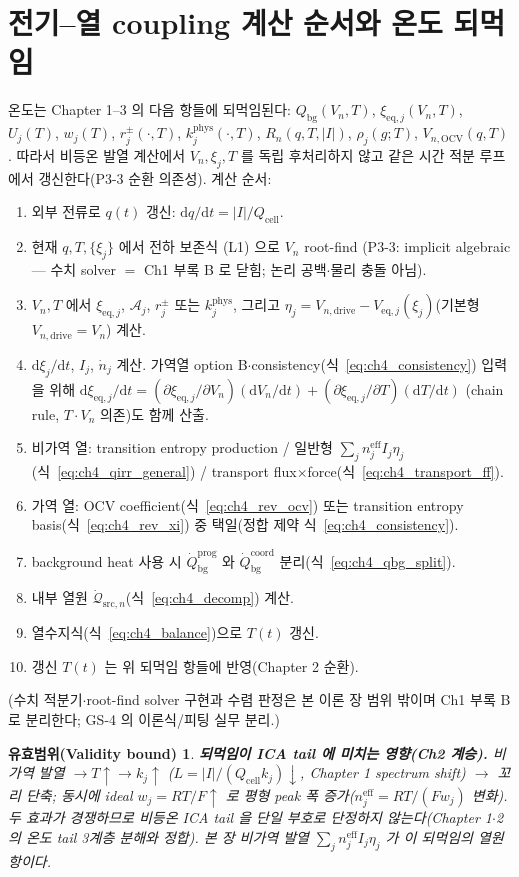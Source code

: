 \documentclass[11pt,a4paper]{article}
\newtheorem*{boundbox}{유효범위(Validity bound)}
\newcommand{\dd}{\mathrm{d}}
\newcommand{\eff}{\mathrm{eff}}
\newcommand{\eq}{\mathrm{eq}}
\newcommand{\drive}{\mathrm{drive}}
\newcommand{\bg}{\mathrm{bg}}
\newcommand{\cell}{\mathrm{cell}}
\newcommand{\OCV}{\mathrm{OCV}}
\newcommand{\src}{\mathrm{src}}
\newcommand{\prog}{\mathrm{prog}}
\newcommand{\coord}{\mathrm{coord}}
\begin{document}
\section{전기--열 coupling 계산 순서와 온도 되먹임}\label{sec:ch4_order}
온도는 Chapter 1--3 의 다음 항들에 되먹임된다: $Q_\bg(V_n,T)$, $\xi_{\eq,j}(V_n,T)$, $U_j(T)$, $w_j(T)$,
$r_j^\pm(\cdot,T)$, $k_j^{\mathrm{phys}}(\cdot,T)$, $R_n(q,T,|I|)$, $\rho_j(g;T)$, $V_{n,\OCV}(q,T)$. 따라서
비등온 발열 계산에서 $V_n,\xi_j,T$ 를 독립 후처리하지 않고 같은 시간 적분 루프에서 갱신한다(P3-3 순환 의존성).
계산 순서:
\begin{enumerate}[label=\arabic*),leftmargin=2.0em]
\item 외부 전류로 $q(t)$ 갱신: $\dd q/\dd t=|I|/Q_\cell$.
\item 현재 $q,T,\{\xi_j\}$ 에서 전하 보존식 (L1) 으로 $V_n$ root-find (P3-3: implicit algebraic — 수치 solver $=$
  Ch1 부록 B 로 닫힘; 논리 공백$\cdot$물리 충돌 아님).
\item $V_n,T$ 에서 $\xi_{\eq,j}$, $\mathcal A_j$, $r_j^\pm$ 또는 $k_j^{\mathrm{phys}}$, 그리고
  $\eta_j=V_{n,\drive}-V_{\eq,j}(\xi_j)$(기본형 $V_{n,\drive}=V_n$) 계산.
\item $\dd\xi_j/\dd t$, $I_j$, $\dot n_j$ 계산. 가역열 option B$\cdot$consistency(식~\eqref{eq:ch4_consistency})
  입력을 위해 $\dd\xi_{\eq,j}/\dd t=(\partial\xi_{\eq,j}/\partial V_n)(\dd V_n/\dd t)+(\partial\xi_{\eq,j}/\partial T)(\dd T/\dd t)$
  (chain rule, $T\cdot V_n$ 의존)도 함께 산출.
\item 비가역 열: transition entropy production / 일반형 $\sum_j n_j^{\eff}I_j\eta_j$(식~\eqref{eq:ch4_qirr_general})
  / transport flux$\times$force(식~\eqref{eq:ch4_transport_ff}).
\item 가역 열: OCV coefficient(식~\eqref{eq:ch4_rev_ocv}) 또는 transition entropy basis(식~\eqref{eq:ch4_rev_xi})
  중 택일(정합 제약 식~\eqref{eq:ch4_consistency}).
\item background heat 사용 시 $\dot Q_\bg^{\prog}$ 와 $\dot Q_\bg^{\coord}$ 분리(식~\eqref{eq:ch4_qbg_split}).
\item 내부 열원 $\dot{\mathcal Q}_{\src,n}$(식~\eqref{eq:ch4_decomp}) 계산.
\item 열수지식(식~\eqref{eq:ch4_balance})으로 $T(t)$ 갱신.
\item 갱신 $T(t)$ 는 위 되먹임 항들에 반영(Chapter 2 순환).
\end{enumerate}
(수치 적분기$\cdot$root-find solver 구현과 수렴 판정은 본 이론 장 범위 밖이며 Ch1 부록 B 로 분리한다; GS-4 의
이론식/피팅 실무 분리.)
\begin{boundbox}
\textbf{되먹임이 ICA tail 에 미치는 영향(Ch2 계승).} 비가역 발열 $\to T\uparrow\to k_j\uparrow$
($L=|I|/(Q_\cell k_j)\downarrow$, Chapter 1 spectrum shift) $\to$ 꼬리 단축; 동시에 ideal $w_j=RT/F\uparrow$ 로
평형 peak 폭 증가($n_j^{\eff}=RT/(Fw_j)$ 변화). 두 효과가 경쟁하므로 비등온 ICA tail 을 단일 부호로 단정하지
않는다(Chapter 1$\cdot$2 의 온도 tail 3계층 분해와 정합). 본 장 비가역 발열 $\sum_j n_j^{\eff}I_j\eta_j$ 가
이 되먹임의 열원 항이다.
\end{boundbox}
\end{document}
